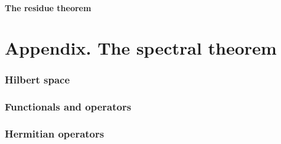 \documentclass[a4paper]{article}
\begin{document}
\subsection{The residue theorem}

\part*{Appendix. The spectral theorem}

\section{Hilbert space}

\section{Functionals and operators}

\section{Hermitian operators}
\end{document}
